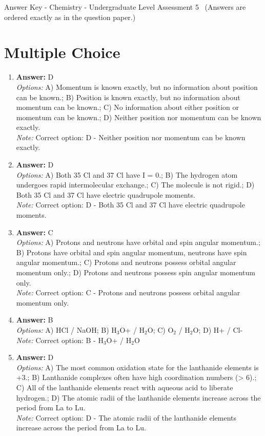 \documentclass[12pt]{article}
\begin{document}
\begin{center}
Answer Key - Chemistry - Undergraduate Level Assessment 5 \
\small (Answers are ordered exactly as in the question paper.)
\end{center}

\section*{Multiple Choice}
\begin{enumerate}[label=\arabic*.]
\item \textbf{Answer:} D
\\ \textit{Options:} A) Momentum is known exactly, but no information about position can be known.; B) Position is known exactly, but no information about momentum can be known.; C) No information about either position or momentum can be known.; D) Neither position nor momentum can be known exactly.
\\ \textit{Note:} Correct option: D - Neither position nor momentum can be known exactly.
\item \textbf{Answer:} D
\\ \textit{Options:} A) Both 35 Cl and 37 Cl have I = 0.; B) The hydrogen atom undergoes rapid intermolecular exchange.; C) The molecule is not rigid.; D) Both 35 Cl and 37 Cl have electric quadrupole moments.
\\ \textit{Note:} Correct option: D - Both 35 Cl and 37 Cl have electric quadrupole moments.
\item \textbf{Answer:} C
\\ \textit{Options:} A) Protons and neutrons have orbital and spin angular momentum.; B) Protons have orbital and spin angular momentum, neutrons have spin angular momentum.; C) Protons and neutrons possess orbital angular momentum only.; D) Protons and neutrons possess spin angular momentum only.
\\ \textit{Note:} Correct option: C - Protons and neutrons possess orbital angular momentum only.
\item \textbf{Answer:} B
\\ \textit{Options:} A) HCl / NaOH; B) H$_{3}$O+ / H$_{2}$O; C) O$_{2}$ / H$_{2}$O; D) H+ / Cl-
\\ \textit{Note:} Correct option: B - H$_{3}$O+ / H$_{2}$O
\item \textbf{Answer:} D
\\ \textit{Options:} A) The most common oxidation state for the lanthanide elements is +3.; B) Lanthanide complexes often have high coordination numbers (\textgreater{} 6).; C) All of the lanthanide elements react with aqueous acid to liberate hydrogen.; D) The atomic radii of the lanthanide elements increase across the period from La to Lu.
\\ \textit{Note:} Correct option: D - The atomic radii of the lanthanide elements increase across the period from La to Lu.
\end{enumerate}
\end{document}
